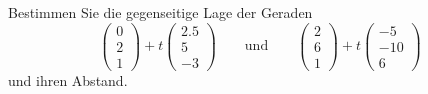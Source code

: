 Bestimmen Sie die gegenseitige Lage der Geraden
\[
\begin{pmatrix}0\\2\\1\end{pmatrix}
+t
\begin{pmatrix}2.5\\5\\-3\end{pmatrix}
\qquad
\text{und}
\qquad
\begin{pmatrix}2\\6\\1\end{pmatrix}
+t
\begin{pmatrix}-5\\-10\\6\end{pmatrix}
\]
und ihren Abstand.


